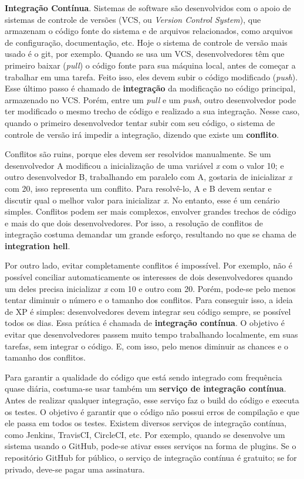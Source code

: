 \documentclass[
  11pt,
  twoside]{book}
\begin{document}
 \textbf{Integração Contínua}. Sistemas de
software são desenvolvidos com o apoio de sistemas de controle de
versões (VCS, ou \emph{Version Control System}), que armazenam o código
fonte do sistema e de arquivos relacionados, como arquivos de
configuração, documentação, etc. Hoje o sistema de controle de versão
mais usado é o git, por exemplo. Quando se usa um VCS, desenvolvedores
têm que primeiro baixar (\emph{pull}) o código fonte para sua máquina
local, antes de começar a trabalhar em uma tarefa. Feito isso, eles
devem subir o código modificado (\emph{push}). Esse último passo é
chamado de \textbf{integração} da modificação no código principal,
armazenado no VCS. Porém, entre um \emph{pull} e um \emph{push}, outro
desenvolvedor pode ter modificado o mesmo trecho de código e realizado a
sua integração. Nesse caso, quando o primeiro desenvolvedor tentar subir
com seu código, o sistema de controle de versão irá impedir a
integração, dizendo que existe um \textbf{conflito}.

Conflitos são ruins, porque eles devem ser resolvidos manualmente. Se um
desenvolvedor A modificou a inicialização de uma variável \emph{x} com o
valor 10; e outro desenvolvedor B, trabalhando em paralelo com A,
gostaria de inicializar \emph{x} com 20, isso representa um conflito.
Para resolvê-lo, A e B devem sentar e discutir qual o melhor valor para
inicializar \emph{x}. No entanto, esse é um cenário simples. Conflitos
podem ser mais complexos, envolver grandes trechos de código e mais do
que dois desenvolvedores. Por isso, a resolução de conflitos de
integração costuma demandar um grande esforço, resultando no que se
chama de \textbf{integration hell}.

Por outro lado, evitar completamente conflitos é impossível. Por
exemplo, não é possível conciliar automaticamente os interesses de dois
desenvolvedores quando um deles precisa inicializar \emph{x} com 10 e
outro com 20. Porém, pode-se pelo menos tentar diminuir o número e o
tamanho dos conflitos. Para conseguir isso, a ideia de XP é simples:
desenvolvedores devem integrar seu código sempre, se possível todos os
dias. Essa prática é chamada de \textbf{integração contínua}. O objetivo
é evitar que desenvolvedores passem muito tempo trabalhando localmente,
em suas tarefas, sem integrar o código. E, com isso, pelo menos diminuir
as chances e o tamanho dos conflitos.

Para garantir a qualidade do código que está sendo integrado com
frequência quase diária, costuma-se usar também um \textbf{serviço de
integração contínua}. Antes de realizar qualquer integração, esse
serviço faz o build do código e executa os testes. O objetivo é garantir
que o código não possui erros de compilação e que ele passa em todos os
testes. Existem diversos serviços de integração contínua, como Jenkins,
TravisCI, CircleCI, etc. Por exemplo, quando se desenvolve um sistema
usando o GitHub, pode-se ativar esses serviços na forma de plugins. Se o
repositório GitHub for público, o serviço de integração contínua é
gratuito; se for privado, deve-se pagar uma assinatura.
\end{document}
